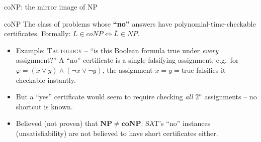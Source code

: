 \documentclass[11pt,aspectratio=169]{beamer}
\begin{document}
\begin{frame}{coNP: the mirror image of NP}
  \begin{block}{coNP}
    The class of problems whose \textbf{``no''} answers have polynomial-time-checkable
    certificates. Formally: $L \in coNP \iff \overline{L} \in NP$.
  \end{block}
  \begin{itemize}
    \item Example: \textsc{Tautology} -- ``is this Boolean formula true under
    \emph{every} assignment?'' A ``no'' certificate is a single falsifying assignment,
    e.g.\ for $\varphi = (x \lor y) \land (\lnot x \lor \lnot y)$, the assignment
    $x{=}y{=}\text{true}$ falsifies it -- checkable instantly.
    \item But a ``yes'' certificate would seem to require checking \emph{all}
    $2^n$ assignments -- no shortcut is known.
    \item Believed (not proven) that $\mathbf{NP \ne coNP}$: SAT's ``no'' instances
    (unsatisfiability) are not believed to have short certificates either.
  \end{itemize}
\end{frame}
\end{document}
